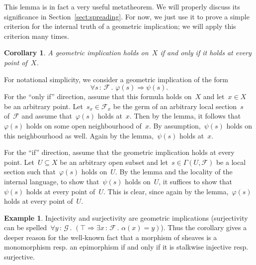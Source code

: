 \documentclass[10pt,reqno,a4paper]{amsbook}
\makeatletter
\theoremstyle{definition}
\newtheorem{ex}[defn]{Example}
\theoremstyle{plain}
\newtheorem{cor}[defn]{Corollary}
\theoremstyle{remark}
\newcommand{\F}{\mathcal{F}}
\renewcommand{\G}{\mathcal{G}}
\newcommand{\?}{\,{:}\,}
\renewcommand{\_}{\mathpunct{.}\,}
\newcommand{\resp}{resp.\@\xspace}
\renewenvironment{proof}[1][\proofname]{\par
  \pushQED{\qed}%
  \normalfont \topsep6\p@\@plus6\p@\relax
  \trivlist
  \item[\hskip\labelsep
        \itshape
    #1\@addpunct{.}]\ignorespaces
}{%
  \popQED\endtrivlist\@endpefalse
}
\makeatother
\begin{document}
This lemma is in fact a very useful metatheorem. We will properly discuss its
significance in Section~\ref{sect:spreading}. For now, we just use it to prove a
simple criterion for the internal truth of a geometric implication; we will
apply this criterion many times.

\begin{cor}\label{cor:geometric-implication}
A geometric implication holds on~$X$ if and only if it holds at
every point of~$X$.\end{cor}
\begin{proof}For notational simplicity, we consider a geometric implication of
the form
\[ \forall s\?\F\_ \varphi(s) \Rightarrow \psi(s). \]
For the ``only if'' direction, assume that this formula holds on~$X$ and let~$x
\in X$ be an arbitrary point. Let~$s_x \in \F_x$ be the germ of an arbitrary
local section~$s$ of~$\F$ and assume that~$\varphi(s)$ holds at~$x$. Then by
the lemma, it follows that~$\varphi(s)$ holds on some open neighbourhood of~$x$. By
assumption,~$\psi(s)$ holds on this neighbourhood as well. Again by the
lemma,~$\psi(s)$ holds at~$x$.

For the ``if'' direction, assume that the geometric implication holds at every
point. Let~$U \subseteq X$ be an arbitrary open subset and let~$s \in
\Gamma(U,\F)$ be a local section such that~$\varphi(s)$ holds on~$U$. By the
lemma and the locality of the internal language, to show that~$\psi(s)$ holds
on~$U$, it suffices to show that~$\psi(s)$
holds at every point of~$U$. This is clear, since again by the
lemma,~$\varphi(s)$ holds at every point of~$U$.
\end{proof}

\begin{ex}Injectivity and surjectivity are geometric implications (surjectivity
can be spelled~$\forall y\?\G\_ (\top \Rightarrow \exists x\?\F\_ \alpha(x) =
y)$). Thus the corollary gives a deeper reason for the well-known fact that a
morphism of sheaves is a monomorphism \resp an epimorphism if and only if it is
stalkwise injective \resp surjective.\end{ex}
\end{document}
